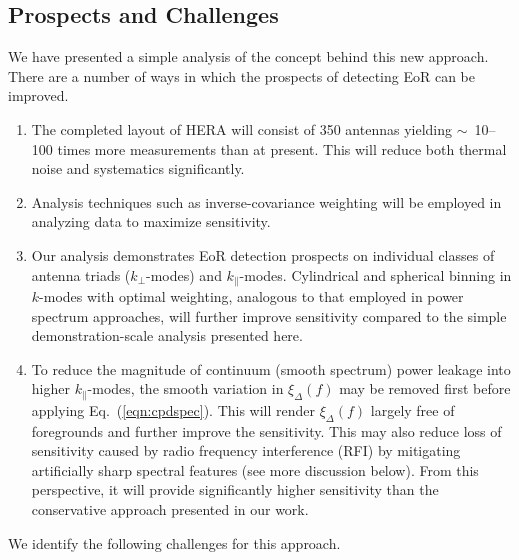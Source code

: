 \documentclass[
reprint,
superscriptaddress,
amsmath,
amssymb,
aps,
prd
]{revtex4-1}
\begin{document}
\subsection{Prospects and Challenges}\label{sec:prospects-challenges}

We have presented a simple analysis of the concept behind this new approach. There are a number of ways in which the prospects of detecting EoR can be improved.

\begin{enumerate}
\item The completed layout of HERA will consist of 350 antennas yielding $\sim$~10--100 times more measurements than at present. This will reduce both thermal noise and systematics significantly. 
\item Analysis techniques such as inverse-covariance weighting \cite{liu14a,liu14b,dil15} will be employed in analyzing data to maximize sensitivity.
\item Our analysis demonstrates EoR detection prospects on individual classes of antenna triads ($k_\perp$-modes) and $k_\parallel$-modes. Cylindrical and spherical binning in $k$-modes with optimal weighting, analogous to that employed in power spectrum approaches, will further improve sensitivity compared to the simple demonstration-scale analysis presented here.
\item To reduce the magnitude of continuum (smooth spectrum) power leakage into higher $k_\parallel$-modes, the smooth variation in $\xi_\Delta(f)$ may be removed first before applying Eq.~(\ref{eqn:cpdspec}). This will render $\xi_\Delta(f)$ largely free of foregrounds and further improve the sensitivity. This may also reduce loss of sensitivity caused by radio frequency interference (RFI) by mitigating artificially sharp spectral features (see more discussion below). From this perspective, it will provide significantly higher sensitivity than the conservative approach presented in our work.
\end{enumerate}

We identify the following challenges for this approach.
\end{document}
